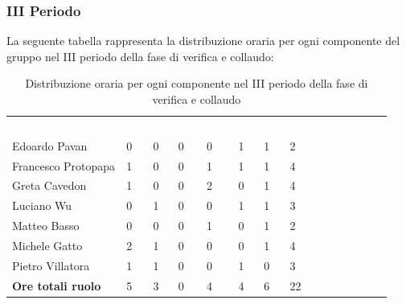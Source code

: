 \subsubsection{III Periodo}
La seguente tabella rappresenta la distribuzione oraria per ogni componente del gruppo nel III periodo della fase di verifica e collaudo:
\begin{table}[!htbp]
\begin{center}
\renewcommand{\arraystretch}{1.25}
\begin{tabular}{ m{}<{\centering}  m{}<{\centering} m{}<{\centering} m{}<{\centering}  m{}<{\centering}  m{}<{\centering}  m{}<{\centering}  m{}<{\centering}   }
	\rowcolor{darkblue}
	\textcolor{white}{\textbf{Componente}} &\textcolor{white}{\textbf{Re}}&\textcolor{white}{\textbf{Pt}}&\textcolor{white}{\textbf{An}}&\textcolor{white}{\textbf{Am}}&\textcolor{white}{\textbf{Pr}}&\textcolor{white}{\textbf{Ve}}&\textcolor{white}{\textbf{Ore complessive}}\\ 
	Edoardo Pavan & 0 & 0 & 0 & 0 & 1 & 1 & 2 \\	
	
	Francesco Protopapa & 1 & 0 & 0 & 1 & 1 & 1 & 4 \\

	Greta Cavedon & 1 & 0 & 0 & 2 & 0 & 1 & 4 \\
	
	Luciano Wu & 0 & 1 & 0 & 0 & 1 & 1 & 3 \\
	
	Matteo Basso & 0 & 0 & 0 & 1 & 0 & 1 & 2 \\
	
	Michele Gatto & 2  & 1 & 0 & 0 & 0 & 1 & 4 \\
	
	Pietro Villatora & 1 & 1 & 0 & 0 & 1 & 0 & 3 \\
	
	\textbf{Ore totali ruolo} & 5 & 3 & 0 & 4 & 4 & 6 & 22 \\

\end{tabular}
\caption{Distribuzione oraria per ogni componente nel III periodo della fase di verifica e collaudo}
\end{center}
\end{table}

